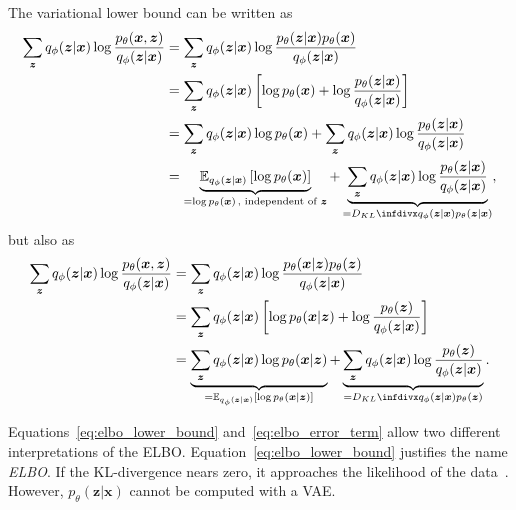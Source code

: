 The variational lower bound can be written as
\begin{align}
    \sum_{\bm{z}} q_\phi(\bm{z}|\bm{x}) \log \frac{p_\theta(\bm{x},\bm{z})}{q_\phi(\bm{z}|\bm{x})} &= \sum_{\bm{z}} q_\phi(\bm{z}|\bm{x}) \log \frac{p_\theta(\bm{z}|\bm{x})p_\theta(\bm{x})}{q_\phi(\bm{z}|\bm{x})}\\
    &= \sum_{\bm{z}} q_\phi(\bm{z}|\bm{x}) \left[ \log p_\theta(\bm{x}) + \log \frac{p_\theta(\bm{z}|\bm{x})}{q_\phi(\bm{z}|\bm{x})} \right]\\
    &= \sum_{\bm{z}} q_\phi(\bm{z}|\bm{x})\log p_\theta(\bm{x}) + \sum_{\bm{z}} q_\phi(\bm{z}|\bm{x})\log \frac{p_\theta(\bm{z}|\bm{x})}{q_\phi(\bm{z}|\bm{x})}\\
    &= \underbrace{\mathbb{E}_{q_\phi(\bm{z}|\bm{x})} \left[ \log p_\theta(\bm{x}) \right]}_{=\log p_\theta(\bm{x})\, \text{, independent of $\bm{z}$}} + \underbrace{\sum_{\bm{z}} q_\phi(\bm{z}|\bm{x})\log \frac{p_\theta(\bm{z}|\bm{x})}{q_\phi(\bm{z}|\bm{x})}}_{=\kldiv{q_\phi(\bm{z}|\bm{x})}{p_\theta(\bm{z}|\bm{x})}}, \label{eq:elbo_lower_bound}
\end{align}
but also as
\begin{align}
    \sum_{\bm{z}} q_\phi(\bm{z}|\bm{x}) \log \frac{p_\theta(\bm{x},\bm{z})}{q_\phi(\bm{z}|\bm{x})} &= \sum_{\bm{z}} q_\phi(\bm{z}|\bm{x}) \log \frac{p_\theta(\bm{x}|\bm{z})p_\theta(\bm{z})}{q_\phi(\bm{z}|\bm{x})}\\
    &= \sum_{\bm{z}} q_\phi(\bm{z}|\bm{x}) \left[ \log p_\theta(\bm{x}|\bm{z}) + \log \frac{p_\theta(\bm{z})}{q_\phi(\bm{z}|\bm{x})} \right]\\
    &= \underbrace{\sum_{\bm{z}} q_\phi(\bm{z}|\bm{x})\log p_\theta(\bm{x}|\bm{z})}_{=\mathbb{E}_{q_\phi(\bm{z}|\bm{x})}\left[ \log p_\theta(\bm{x}|\bm{z}) \right]} + \underbrace{\sum_{\bm{z}} q_\phi(\bm{z}|\bm{x})\log \frac{p_\theta(\bm{z})}{q_\phi(\bm{z}|\bm{x})}}_{=\kldiv{q_\phi(\bm{z}|\bm{x})}{p_\theta(\bm{z})}}. \label{eq:elbo_error_term}
\end{align}

Equations~\ref{eq:elbo_lower_bound} and~\ref{eq:elbo_error_term} allow two different interpretations of the \ac{ELBO}.
Equation~\ref{eq:elbo_lower_bound} justifies the name \textit{\acl{ELBO}}.
If the \ac{KL-divergence} nears zero, it approaches the likelihood of the data~\citep[p. 18]{kingma2019introduction}.
However, $p_\theta(\bm{z}|\bm{x})$ cannot be computed with a \ac{VAE}.

